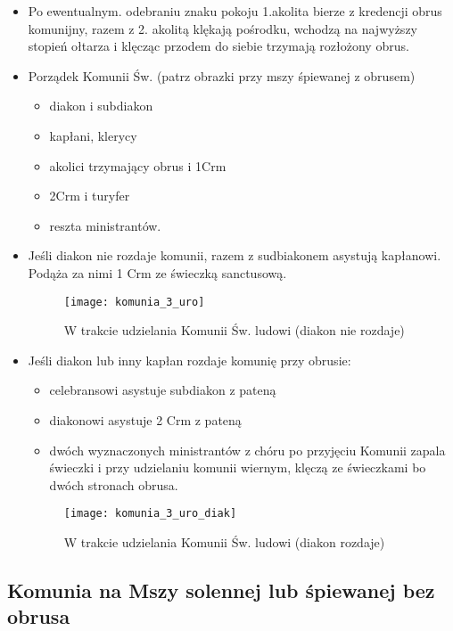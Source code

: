 			\begin{itemize}
				\item Po ewentualnym. odebraniu znaku pokoju 1.akolita bierze z kredencji obrus komunijny, razem z 2. akolitą klękają pośrodku, wchodzą na najwyższy stopień ołtarza i klęcząc przodem do siebie trzymają rozłożony obrus.
				\item Porządek Komunii Św. (patrz obrazki przy mszy śpiewanej z obrusem)
					\begin{itemize}
						\item diakon i subdiakon
						\item kapłani, klerycy
						\item akolici trzymający obrus i 1Crm
						\item 2Crm i turyfer
						\item reszta ministrantów.
					\end{itemize}
				\item Jeśli diakon nie rozdaje komunii, razem z sudbiakonem asystują kapłanowi. Podąża za nimi 1 Crm ze świeczką sanctusową.
					\begin{figure}[h]
						\centering
						\texttt{[image: komunia\_3\_uro]}
						\caption{W trakcie udzielania Komunii Św. ludowi (diakon nie rozdaje)}
						\label{fig:komunia_3_uro}
					\end{figure}
				\item Jeśli diakon lub inny kapłan rozdaje komunię przy obrusie:
					\begin{itemize}
						\item celebransowi asystuje subdiakon z pateną
						\item diakonowi asystuje 2 Crm z pateną
						\item dwóch wyznaczonych ministrantów z chóru po przyjęciu Komunii zapala świeczki i przy udzielaniu komunii wiernym, klęczą ze świeczkami bo dwóch stronach obrusa.
					\end{itemize}
					\begin{figure}[ht]
						\centering
						\texttt{[image: komunia\_3\_uro\_diak]}
						\caption{W trakcie udzielania Komunii Św. ludowi (diakon rozdaje)}
						\label{fig:komunia_3_uro_1}
					\end{figure}
			\end{itemize}
    
    \subsection{Komunia na Mszy solennej lub śpiewanej bez obrusa}
    
